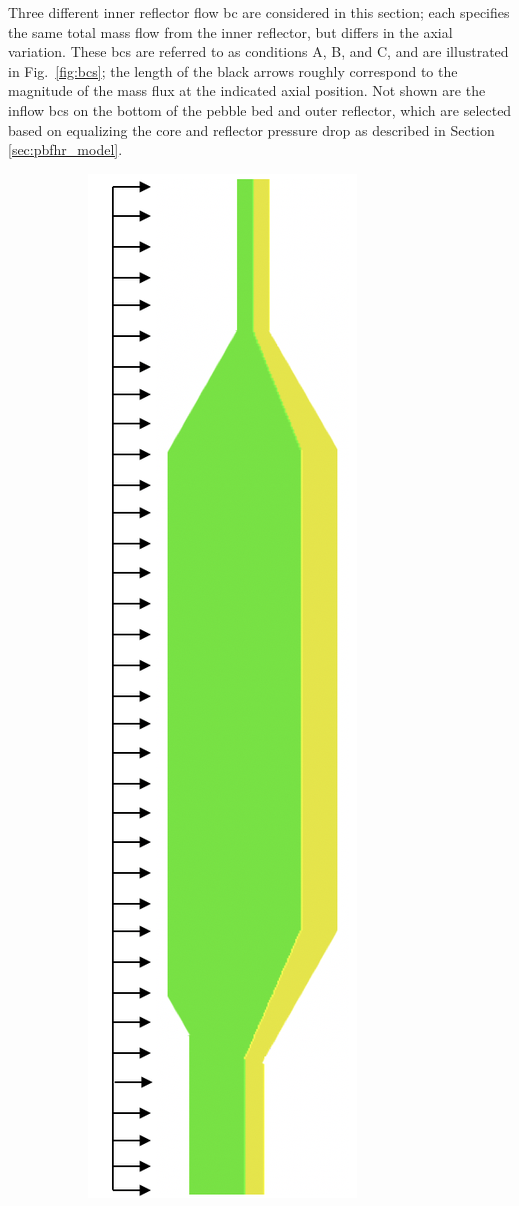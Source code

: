 Three different inner reflector flow \gls{bc} are considered in this section; each specifies the same total mass flow from the inner reflector, but differs in the axial variation. These \glspl{bc} are referred to as conditions A, B, and C, and are illustrated in Fig.\ \ref{fig:bcs}; the length of the black arrows roughly correspond to the magnitude of the mass flux at the indicated axial position. Not shown are the inflow \glspl{bc} on the bottom of the pebble bed and outer reflector, which are selected based on equalizing the core and reflector pressure drop as described in Section \ref{sec:pbfhr_model}.

\begin{figure}[!htb]
\centering
\begin{subfigure}{.32\textwidth}
  \centering
  \includegraphics[height=1.5\linewidth]{figs/bc_A.png}

\end{subfigure}
\end{figure}
